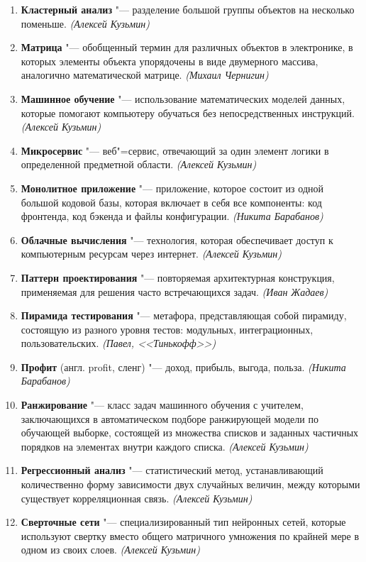 \documentclass[14pt, a4paper]{extarticle}
\begin{document}
\begin{enumerate}
    \item \textbf{Кластерный анализ} "--- разделение большой группы объектов на несколько поменьше. \textit{(Алексей Кузьмин)}
    \item \textbf{Матрица} "--- обобщенный термин для различных объектов в электронике, в которых элементы объекта упорядочены в виде двумерного массива, аналогично математической матрице. \textit{(Михаил Чернигин)}
    \item \textbf{Машинное обучение} "--- использование математических моделей данных, которые помогают компьютеру обучаться без непосредственных инструкций. \textit{(Алексей Кузьмин)}
    \item \textbf{Микросервис} "--- веб"=сервис, отвечающий за один элемент логики в определенной предметной области. \textit{(Алексей Кузьмин)}
    \item \textbf{Монолитное приложение} "--- приложение, которое состоит из одной большой кодовой базы, которая включает в себя все компоненты: код фронтенда, код бэкенда и файлы конфигурации. \textit{(Никита Барабанов)}
    \item \textbf{Облачные вычисления} "--- технология, которая обеспечивает доступ к компьютерным ресурсам через интернет. \textit{(Алексей Кузьмин)}
    \item \textbf{Паттерн проектирования} "--- повторяемая архитектурная конструкция, применяемая для решения часто встречающихся задач. \textit{(Иван Жадаев)}
    \item \textbf{Пирамида тестирования} "--- метафора, представляющая собой пирамиду, состоящую из разного уровня тестов: модульных, интеграционных, пользовательских. \textit{(Павел, <<Тинькофф>>)}
    \item \textbf{Профит} (англ. profit, сленг) "--- доход, прибыль, выгода, польза. \textit{(Никита Барабанов)}
    \item \textbf{Ранжирование} "--- класс задач машинного обучения с учителем, заключающихся в автоматическом подборе ранжирующей модели по обучающей выборке, состоящей из множества списков и заданных частичных порядков на элементах внутри каждого списка. \textit{(Алексей Кузьмин)}
    \item \textbf{Регрессионный анализ} "--- статистический метод, устанавливающий количественно форму зависимости двух случайных величин, между которыми существует корреляционная связь. \textit{(Алексей Кузьмин)}
    \item \textbf{Сверточные сети} "--- специализированный тип нейронных сетей, которые используют свертку вместо общего матричного умножения по крайней мере в одном из своих слоев. \textit{(Алексей Кузьмин)}

\end{enumerate}
\end{document}
